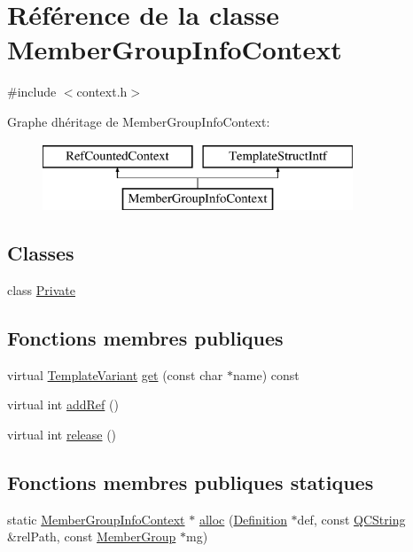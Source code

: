 \hypertarget{class_member_group_info_context}{}\section{Référence de la classe Member\+Group\+Info\+Context}
\label{class_member_group_info_context}


{\ttfamily \#include $<$context.\+h$>$}

Graphe d\textquotesingle{}héritage de Member\+Group\+Info\+Context\+:\begin{figure}[H]
\begin{center}
\leavevmode
\includegraphics[height=2.000000cm]{class_member_group_info_context}
\end{center}
\end{figure}
\subsection*{Classes}
\begin{DoxyCompactItemize}
\item 
class \hyperlink{class_member_group_info_context_1_1_private}{Private}
\end{DoxyCompactItemize}
\subsection*{Fonctions membres publiques}
\begin{DoxyCompactItemize}
\item 
virtual \hyperlink{class_template_variant}{Template\+Variant} \hyperlink{class_member_group_info_context_a18b5fc6bcd9a3b37022de2955afad552}{get} (const char $\ast$name) const 
\item 
virtual int \hyperlink{class_member_group_info_context_a489cd4943cc9a565d3447a6024937a88}{add\+Ref} ()
\item 
virtual int \hyperlink{class_member_group_info_context_a9d31265654c2e5444af3a5fe1a54da46}{release} ()
\end{DoxyCompactItemize}
\subsection*{Fonctions membres publiques statiques}
\begin{DoxyCompactItemize}
\item 
static \hyperlink{class_member_group_info_context}{Member\+Group\+Info\+Context} $\ast$ \hyperlink{class_member_group_info_context_a1fb174d97b31b1a9eb911a54a1c1a6a7}{alloc} (\hyperlink{class_definition}{Definition} $\ast$def, const \hyperlink{class_q_c_string}{Q\+C\+String} \&rel\+Path, const \hyperlink{class_member_group}{Member\+Group} $\ast$mg)
\end{DoxyCompactItemize}


